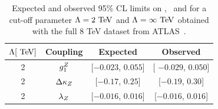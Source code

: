 \begin{table}\centering 
\begin{tabular}{cccc}
\hline
 $\Lambda [\TeV]$ & Coupling & Expected  & Observed \\
\hline
2 	& $g_1^Z$ 		& [$-0.023$, $0.055$]  & [ $-0.029$, $0.050$] \\
2 	& $\Delta \kappa_Z$ 	& [$-0.17$, $0.25$]    & [$-0.19$, $0.30$] \\
2 	& $\lambda_Z$ 	& [$-0.016$, $0.016$]  & [$-0.016$, $0.016$] \\
\hline
\end{tabular}
\caption{Expected and observed 95\% CL limits on \dkz, \lz\ and \gz\; for a cut-off parameter $\Lambda = 2\TeV$ and $\Lambda = \infty\TeV$ obtained with the full 8 TeV dataset from ATLAS~\cite{Aad:2016ett}.}
 \label{tab:sss-WZprod-ATGC}
\end{table}
 










